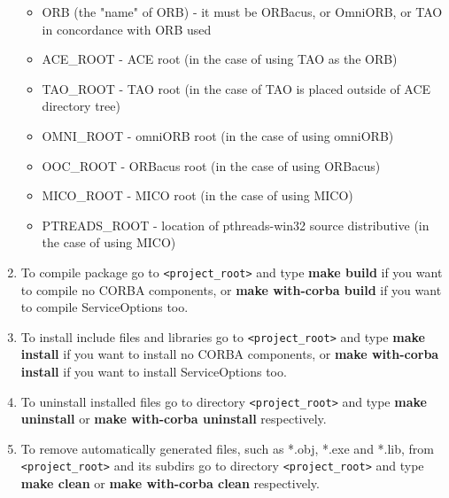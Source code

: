 \documentclass[10pt]{article}
\begin{document}
\begin{enumerate}
       \begin{itemize}

       \item ORB (the "name" of ORB) - it must be ORBacus, or OmniORB, or TAO
             in concordance with ORB used

       \item ACE\_ROOT - ACE root (in the case of using TAO as the ORB)
       \item TAO\_ROOT - TAO root (in the case of TAO is placed outside of ACE directory tree)
       \item OMNI\_ROOT - omniORB root (in the case of using omniORB)
       \item OOC\_ROOT - ORBacus root (in the case of using ORBacus)
       \item MICO\_ROOT - MICO  root (in the case of using MICO)
       \item PTREADS\_ROOT - location of pthreads-win32 source distributive (in the case of using MICO)
       \end{itemize}

 \item To compile package go to \verb|<project_root>| and type {\bf make build}
       if you want to compile no CORBA components,
       or {\bf make with-corba build} if you want to compile ServiceOptions too.
 
 \item To install include files and libraries go to \verb|<project_root>|
       and type {\bf make install}
       if you want to install no CORBA components,
       or {\bf make with-corba install} if you want to install ServiceOptions too.
   
 \item To uninstall installed files go to directory \verb|<project_root>| and type 
        {\bf make uninstall} or {\bf make with-corba uninstall} respectively.
 
 \item To remove automatically generated files, such as *.obj, *.exe and *.lib,
       from \verb|<project_root>| and its subdirs go to directory \verb|<project_root>| and type
       {\bf make clean} or {\bf make with-corba clean} respectively.
   

\end{enumerate}
\end{document}
